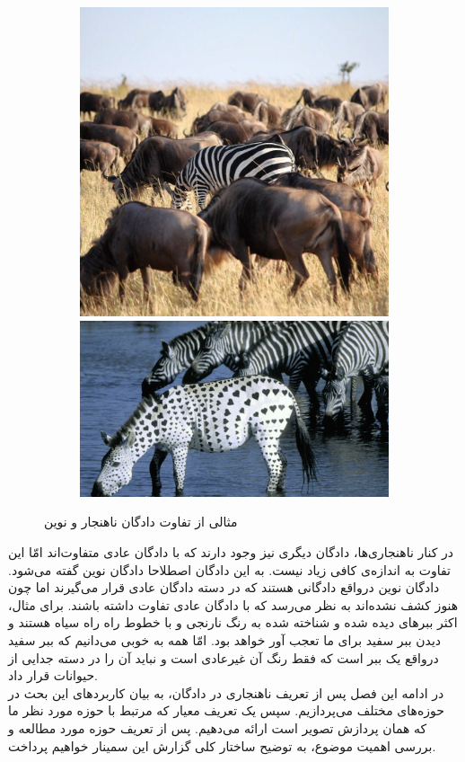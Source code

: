 \documentclass[12pt,a4paper]{report}
\begin{document}
	\begin{figure}[hp]
		  \begin{subfigure}{\linewidth}
			  \includegraphics[width=.5\linewidth]{./images/figures/zibra-anomaly.png}\hfill
			  \includegraphics[width=.5\linewidth]{./images/figures/zibra-novel.png}
		  \end{subfigure}\par\medskip		  
		  \caption{مثالی از تفاوت دادگان ناهنجار و نوین}
		  \label{fig:novel-vs-anomaly}
	\end{figure}

در کنار ناهنجاری‌ها، دادگان دیگری نیز وجود دارند که با دادگان عادی متفاوت‌اند امّا این تفاوت به اندازه‌ی کافی زیاد نیست. به این دادگان اصطلاحا دادگان نوین گفته می‌شود. دادگان نوین درواقع دادگانی هستند که در دسته دادگان عادی قرار می‌گیرند اما چون هنوز کشف نشده‌اند به نظر می‌رسد که با دادگان عادی تفاوت داشته باشند. برای مثال، اکثر ببر‌های دیده شده و شناخته شده به رنگ نارنجی و با خطوط راه راه سیاه هستند و دیدن ببر سفید برای ما تعجب آور خواهد بود. امّا همه به خوبی می‌دانیم که ببر سفید درواقع یک ببر است که فقط رنگ آن غیرعادی است و نباید آن را در دسته جدایی از حیوانات قرار داد.\\

در ادامه این فصل پس از تعریف ناهنجاری در دادگان، به بیان کاربرد‌های این بحث در حوزه‌های مختلف می‌پردازیم. سپس یک تعریف معیار که مرتبط با حوزه مورد نظر ما که همان پردازش تصویر است ارائه می‌دهیم. پس از تعریف حوزه مورد مطالعه و بررسی اهمیت موضوع، به توضیح ساختار کلی گزارش این سمینار خواهیم پرداخت.
		
\end{document}
